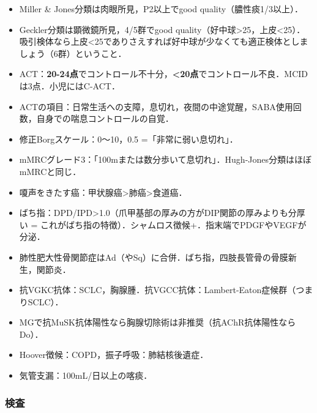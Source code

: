\begin{itemize}
\item Miller \& Jones分類は肉眼所見，P2以上でgood quality（膿性痰1/3以上）．
\item Geckler分類は顕微鏡所見，4/5群でgood quality（好中球>25，上皮<25）．吸引検体なら上皮<25でありさえすれば好中球が少なくても適正検体としましょう（6群）ということ．

\item ACT：\textbf{20-24点}でコントロール不十分，\textbf{<20点}でコントロール不良．MCIDは3点．小児にはC-ACT．
\item ACTの項目：日常生活への支障，息切れ，夜間の中途覚醒，SABA使用回数，自身での喘息コントロールの自覚．
\item 修正Borgスケール：0〜10，0.5 =「非常に弱い息切れ」．
\item mMRCグレード3：「100mまたは数分歩いて息切れ」．Hugh-Jones分類はほぼmMRCと同じ．


\item 嗄声をきたす癌：甲状腺癌>肺癌>食道癌．
\item ばち指：DPD/IPD>1.0（爪甲基部の厚みの方がDIP関節の厚みよりも分厚い = これがばち指の特徴）．シャムロス徴候+．指末端でPDGFやVEGFが分泌．
\item 肺性肥大性骨関節症はAd（やSq）に合併．ばち指，四肢長管骨の骨膜新生，関節炎．
\item 抗VGKC抗体：SCLC，胸腺腫．抗VGCC抗体：Lambert-Eaton症候群（つまりSCLC）．
\item MGで抗MuSK抗体陽性なら胸腺切除術は非推奨（抗AChR抗体陽性ならDo）．
\item Hoover徴候：COPD，振子呼吸：肺結核後遺症．
\item 気管支漏：100mL/日以上の喀痰．
\end{itemize}


\subsubsection{検査}

